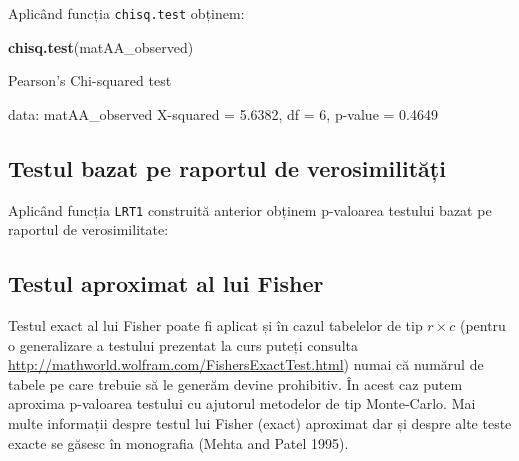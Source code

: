 \documentclass[]{article}
\newenvironment{Shaded}{\begin{snugshade}}{\end{snugshade}}
\newcommand{\KeywordTok}[1]{\textcolor[rgb]{0.13,0.29,0.53}{\textbf{#1}}}
\newcommand{\DecValTok}[1]{\textcolor[rgb]{0.00,0.00,0.81}{#1}}
\newcommand{\FloatTok}[1]{\textcolor[rgb]{0.00,0.00,0.81}{#1}}
\newcommand{\StringTok}[1]{\textcolor[rgb]{0.31,0.60,0.02}{#1}}
\newcommand{\OperatorTok}[1]{\textcolor[rgb]{0.81,0.36,0.00}{\textbf{#1}}}
\newcommand{\NormalTok}[1]{#1}
\begin{document}

Aplicând funcția \texttt{chisq.test} obținem:

\begin{Shaded}
\begin{Highlighting}[]
\KeywordTok{chisq.test}\NormalTok{(matAA_observed)}

\NormalTok{    Pearson}\StringTok{'s Chi-squared test}

\StringTok{data:  matAA_observed}
\StringTok{X-squared = 5.6382, df = 6, p-value = 0.4649}
\end{Highlighting}
\end{Shaded}

\subsection{Testul bazat pe raportul de
verosimilități}\label{testul-bazat-pe-raportul-de-verosimilitati}

Aplicând funcția \texttt{LRT1} construită anterior obținem p-valoarea
testului bazat pe raportul de verosimilitate:

\begin{Shaded}
\end{Shaded}

\subsection{Testul aproximat al lui
Fisher}\label{testul-aproximat-al-lui-fisher}

Testul exact al lui Fisher poate fi aplicat și în cazul tabelelor de tip
\(r\times c\) (pentru o generalizare a testului prezentat la curs puteți
consulta \url{http://mathworld.wolfram.com/FishersExactTest.html}) numai
că numărul de tabele pe care trebuie să le generăm devine prohibitiv. În
acest caz putem aproxima p-valoarea testului cu ajutorul metodelor de
tip Monte-Carlo. Mai multe informații despre testul lui Fisher (exact)
aproximat dar și despre alte teste exacte se găsesc în monografia (Mehta
and Patel 1995).
\end{document}
